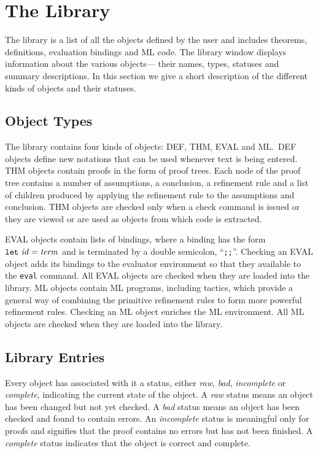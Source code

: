 \chapter{The Library}

The library{} is a list of all the objects defined by the user
and includes
theorems, definitions, evaluation bindings and ML code.
The library{} window displays information about
the various objects---
their names, types, statuses and summary descriptions.
In this section we give a short description of the
different kinds of objects and their statuses.

\section{Object Types}

The library contains four kinds of objects: {} DEF, THM, EVAL and ML.\  DEF
objects define new notations that can be used whenever text is being
entered.  THM objects contain proofs in the form of proof trees.  Each node
of the proof tree contains a number of assumptions, a conclusion, a
refinement rule and a list of children produced by applying the refinement
rule to the assumptions and conclusion.  THM objects are checked only when
a check command is issued or they are viewed or are used as objects from which
code is extracted.

EVAL objects contain lists of bindings, where{} a binding has the form
\({\tt let}\ {\it id}={\it term}\) and is terminated by a double semicolon,
``{\tt ;;}''.  Checking an EVAL object adds its bindings to the evaluator{}
environment so that they available to the {\tt eval}{} command.  All EVAL
objects are checked when they are loaded into the library.  ML objects
contain ML programs, including tactics, which provide a general way of
combining the primitive refinement rules to form more powerful refinement
rules.  Checking an ML object enriches the ML environment.  All ML objects
are checked when they are loaded into the library.

\section{Library Entries}

Every object has associated with it a status{}{}, either {\em raw}{}, {\em
bad}{}, {\em incomplete} {} or {\em complete}{}, indicating the current
state of the object.  A {\em raw} status means an object has been changed
but not yet checked.  A {\em bad} status means an object has been checked
and found to contain errors.  An {\em incomplete} status is meaningful only
for proofs and signifies that the proof contains no errors but has not been
finished.  A {\em complete} status indicates that the object is correct and
complete.


